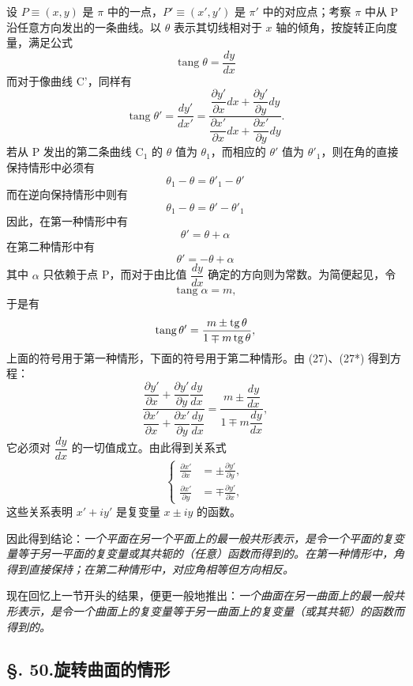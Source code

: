 设 \(P\equiv(x,y)\) 是 \(\pi\) 中的一点，\(P'\equiv(x',y')\) 是 \(\pi'\) 中的对应点；考察 \(\pi\) 中从 P 沿任意方向发出的一条曲线。以 \(\theta\) 表示其切线相对于 \(x\) 轴的倾角，按旋转正向度量，满足公式
\begin{equation}\tag{27}
 \operatorname{tang}\theta=\frac{dy}{dx}
\end{equation}
而对于像曲线 C'，同样有
\begin{equation}\tag{27*}
 \operatorname{tang}\theta'=\frac{dy'}{dx'}=
 \frac{\dfrac{\partial y'}{\partial x}dx+\dfrac{\partial y'}{\partial y}dy}{\dfrac{\partial x'}{\partial x}dx+\dfrac{\partial x'}{\partial y}dy}.
\end{equation}
若从 P 发出的第二条曲线 C\(_1\) 的 \(\theta\) 值为 \(\theta_1\)，而相应的 \(\theta'\) 值为 \(\theta'_1\)，则在角的直接保持情形中必须有
\[
 \theta_1-\theta=\theta'_1-\theta'
\]
而在逆向保持情形中则有
\[
 \theta_1-\theta=\theta'-\theta'_1
\]
因此，在第一种情形中有
\[
 \theta'=\theta+\alpha
\]
在第二种情形中有
\[
 \theta'=-\theta+\alpha
\]
其中 \(\alpha\) 只依赖于点 P，而对于由比值 \(\dfrac{dy}{dx}\) 确定的方向则为常数。为简便起见，令
\[
 \operatorname{tang}\alpha=m,
\]
于是有
\[
 \operatorname{tang}\theta'=\frac{m\pm\operatorname{tg}\theta}{1\mp m\operatorname{tg}\theta},
\]
上面的符号用于第一种情形，下面的符号用于第二种情形。由 (27)、(27*) 得到方程：
\[
\frac{\dfrac{\partial y'}{\partial x}+\dfrac{\partial y'}{\partial y}\dfrac{dy}{dx}}{\dfrac{\partial x'}{\partial x}+\dfrac{\partial x'}{\partial y}\dfrac{dy}{dx}}=
\frac{m\pm\dfrac{dy}{dx}}{1\mp m\dfrac{dy}{dx}},
\]
它必须对 \(\dfrac{dy}{dx}\) 的一切值成立。由此得到关系式
\[
\left\{
\begin{aligned}
\frac{\partial x'}{\partial x}&=\pm\frac{\partial y'}{\partial y},\\[0.4em]
\frac{\partial x'}{\partial y}&=\mp\frac{\partial y'}{\partial x},
\end{aligned}
\right.
\]
这些关系表明 \(x'+iy'\) 是复变量 \(x\pm iy\) 的函数。

因此得到结论：\emph{一个平面在另一个平面上的最一般共形表示，是令一个平面的复变量等于另一平面的复变量或其共轭的（任意）函数而得到的。在第一种情形中，角得到直接保持；在第二种情形中，对应角相等但方向相反。}

现在回忆上一节开头的结果，便更一般地推出：\emph{一个曲面在另一曲面上的最一般共形表示，是令一个曲面上的复变量等于另一曲面上的复变量（或其共轭）的函数而得到的。}

\subsection*{\S. 50.\quad 旋转曲面的情形}

